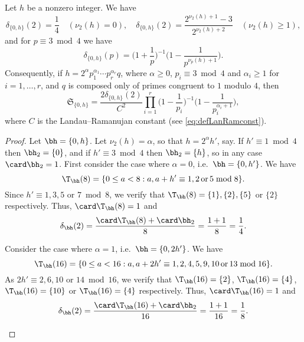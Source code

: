 \documentclass[12pt, reqno, twoside, letterpaper]{amsart}
\begin{document}
\begin{nix}
%   
\begin{proposition}
 \label{Aprop:sssk=2}
%
Let $h$ be a nonzero integer.
%
We have 
\begin{equation}
 \label{Aeq:delthk=2}
  \delta_{\{0,h\}}(2) = \frac{1}{4}
   \quad 
    (\nu_2(h) = 0), 
     \quad 
      \delta_{\{0,h\}}(2)  
       = 
        \frac{2^{\nu_2(h) + 1} - 3}{2^{\nu_2(h) + 2}}
         \quad 
          (\nu_2(h) \ge 1), 
\end{equation}
and for $p \equiv 3 \bmod 4$ we have 
\begin{equation}
 \label{Aeq:delthp3k=2}
 \delta_{\{0,h\}}(p) 
  =
   \bigg(1 + \frac{1}{p}\bigg)^{-1}
    \bigg(1 - \frac{1}{p^{\nu_p(h) + 1}}\bigg).
\end{equation}
%
Consequently, if 
$h = 2^{\alpha}p_1^{\alpha_1}\cdots p_r^{\alpha_r}q$, 
where $\alpha \ge 0$, $p_i \equiv 3 \bmod 4$ and $\alpha_i \ge 1$ 
for $i = 1,\ldots,r$, and $q$ is composed only of primes congruent 
to $1$ modulo $4$, then  
\begin{equation}
 \label{Aeq:sssk=2}
 \mathfrak{S}_{\{0,h\}}
  =
   \frac{2\delta_{\{0,h\}}(2)}{C^2}
    \prod_{i = 1}^r
     \bigg(1 - \frac{1}{p_i}\bigg)^{-1}
      \bigg(1 - \frac{1}{p_i^{\alpha_i + 1}}\bigg),
\end{equation}
where $C$ is the Landau--Ramanujan constant 
\textup{(}see \eqref{eq:defLanRamconst}\textup{)}.
\end{proposition}

\begin{proof}
%
Let $\bh = \{0,h\}$.
%
Let $\nu_2(h) = \alpha$, so that $h = 2^{\alpha}h'$, say.
%
If $h' \equiv 1 \bmod 4$ then $\bh_2 = \{0\}$, and if 
$h' \equiv 3 \bmod 4$ then $\bh_2 = \{h\}$, so in any case 
$\card \bh_2 = 1$.
%
First consider the case where $\alpha = 0$, i.e.\ 
$\bh = \{0,h'\}$.
%
We have 
\[
 \T_{\bh}(8)
  =
   \{0 \le a < 8 : a,a + h' \equiv 1,2 \, \hbox{or} \, 5 \bmod 8\}.
\]
%
Since $h' \equiv 1,3,5$ or $7 \bmod 8$, we verify that  
$\T_{\bh}(8) = \{1\},\{2\},\{5\}$ or $\{2\}$ respectively.
%
Thus, $\card \T_{\bh}(8) = 1$ and 
\[
 \delta_{\bh}(2) 
  =
   \frac{\card \T_{\bh}(8) + \card \bh_2}{8}
    =
     \frac{1 + 1}{8}
      = 
       \frac{1}{4}.
\]
%
\begin{nixnix}
%
Consider the case where $\alpha = 1$, i.e.\ 
$\bh = \{0,2h'\}$.
%
We have 
\[
 \T_{\bh}(16) 
  =
   \{0 \le a < 16 : a, a + 2h' \equiv 1,2,4,5,9,10 \, \hbox{or} \, 13 \bmod 16\}.
\]
%
As $2h' \equiv 2,6,10$ or $14 \bmod 16$, we verify that 
$\T_{\bh}(16) = \{2\}$, $\T_{\bh}(16) = \{4\}$, 
$\T_{\bh}(16) = \{10\}$ or $\T_{\bh}(16) = \{4\}$ respectively.
%
Thus, $\card \T_{\bh}(16) = 1$ and 
\[
 \delta_{\bh}(2) 
  =
   \frac{\card \T_{\bh}(16) + \card \bh_2}{16}
    =
     \frac{1 + 1}{16}
      = 
       \frac{1}{8}.
\]
%
\end{nixnix}


\end{proof}
\end{nix}
\end{document}
